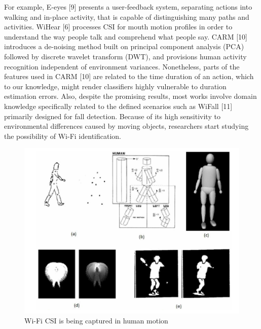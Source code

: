 \documentclass[conference]{IEEEtran}
\begin{document}
For example, E-eyes [9] presents a user-feedback system, separating actions into walking and in-place activity, that is capable of distinguishing many paths and activities. WiHear [6] processes CSI for mouth motion profiles in order to understand the way people talk and comprehend what people say. CARM [10] introduces a de-noising method built on principal component analysis (PCA) followed by discrete wavelet transform (DWT), and provisions human activity recognition independent of environment variances. Nonetheless, parts of the features used in CARM [10] are related to the time duration of an action, which to our knowledge, might render classifiers highly vulnerable to duration estimation errors. Also, despite the promising results, most works involve domain knowledge specifically related to the defined scenarios such as WiFall [11] primarily designed for fall detection. Because of its high sensitivity to environmental differences caused by moving objects, researchers start studying the possibility of Wi-Fi identification. \newline


\begin{figure}[h!]
    \includegraphics[scale=0.40]{fig7.png}
    \caption{Wi-Fi CSI is being captured in human motion}
    \label{fig:me}
\end{figure}
\end{document}
